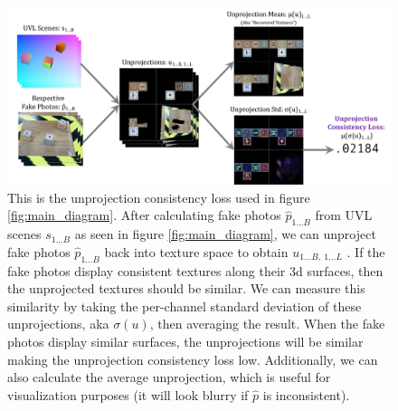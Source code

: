 \documentclass{article}
\begin{document}
\begin{figure}[H]
	\begin{center}
		\includegraphics[width=400pt]{../images/unprojection_consistency_loss.pdf}
	\end{center}
	\caption{
		This is the unprojection consistency loss used in figure \ref{fig:main_diagram}.
		After calculating fake photos $\hat{p}_{1...B}$ from UVL scenes $s_{1...B}$ as seen in figure \ref{fig:main_diagram}, 
		we can unproject fake photos $\hat{p}_{1...B}$ back into texture space to obtain $u_{1...B,\ 1...L}$ .
		If the fake photos display consistent textures along their 3d surfaces, then the unprojected textures should be similar.
		We can measure this similarity by taking the per-channel standard deviation of these unprojections, aka $\sigma(u)$, then averaging the result.
		When the fake photos display similar surfaces, the unprojections will be similar making the unprojection consistency loss low.
		Additionally, we can also calculate the average unprojection, which is useful for visualization purposes (it will look blurry if $\hat{p}$ is inconsistent).
	}
	\label{fig:unprojection_consistency_loss}
\end{figure}
\end{document}
